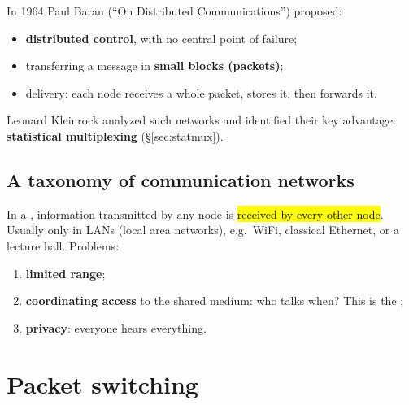 In 1964 Paul Baran (``On Distributed Communications'') proposed:
\begin{itemize}
  \item \textbf{distributed control}, with no central point of failure;
  \item transferring a message in \textbf{small blocks (packets)};
  \item {} delivery: each node receives a whole packet, stores it, then forwards it.
\end{itemize}
Leonard Kleinrock analyzed such networks and identified their key advantage: \textbf{statistical multiplexing} (\S\ref{sec:statmux}).

\subsection{A taxonomy of communication networks}

\begin{center}
\end{center}

\begin{defn}
In a , information transmitted by any node is \hl{received by every other node}. Usually only in LANs (local area networks),
e.g.\ WiFi, classical Ethernet, or a lecture hall. Problems:
\begin{enumerate}
  \item \textbf{limited range};
  \item \textbf{coordinating access} to the shared medium: who talks when? This is the ;
  \item \textbf{privacy}: everyone hears everything.
\end{enumerate}
\end{defn}

\section{Packet switching}

